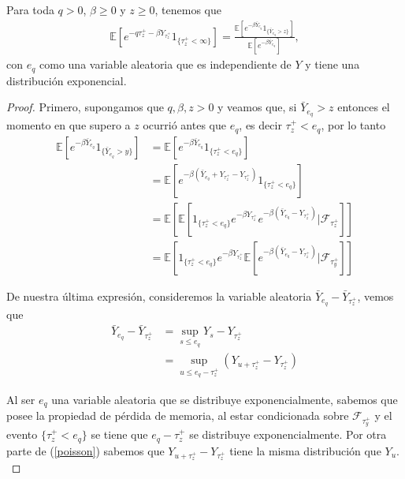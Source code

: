 \begin{lemma}
Para toda $q > 0$, $\beta \geq 0$ y $z \geq 0$, tenemos que
\begin{align}
	\mathbb{E} \left[ e^{-q \tau_{z}^{+} - \beta Y_{\tau_{z}^{+}}} 1_{ \{ \tau_{z}^{+} < \infty \} } \right] = \frac{\mathbb{E} \left[ e^{- \beta \bar{Y}_{e_q}} 1_{ \{ \bar{Y}_{e_q} > z \} } \right]}{\mathbb{E} \left[ e^{- \beta \bar{Y}_{e_q}} \right]}, \label{lema_mckean}
\end{align}
con $e_q$ como una variable aleatoria que es independiente de $Y$ y tiene una distribución exponencial.
\end{lemma}
\begin{proof}
Primero, supongamos que $q, \beta, z > 0$ y veamos que, si $\bar{Y}_{e_q} > z$ entonces el momento en que supero a $z$ ocurrió antes que $e_q$, es decir $\tau_z^{+} < e_q$, por lo tanto
\begin{align*}
	\mathbb{E} \left[ e^{- \beta \bar{Y}_{e_q}} 1_{ \{ \bar{Y}_{e_q} > y \}} \right]  & = \mathbb{E} \left[ e^{- \beta \bar{Y}_{e_q}} 1_{\{\tau_z^{+} < e_q\}} \right] \\
    & = \mathbb{E} \left[ e^{- \beta ( \bar{Y}_{e_q} + Y_{\tau_z^{+}} - Y_{\tau_z^{+}} )} 1_{\{\tau_z^{+} < e_q\}} \right] \\
    & = \mathbb{E} \left[ \mathbb{E} \left[ 1_{\{\tau_z^{+} < e_q\}} e^{- \beta Y_{\tau_z^{+}}} e^{ - \beta (\bar{Y}_{e_q} - Y_{\tau_z^{+}})} \bigg|  \mathcal{F}_{\tau_z^{+}} \right] \right] \\
    & = \mathbb{E} \left[ 1_{\{\tau_z^{+} < e_q\}} e^{- \beta Y_{\tau_z^{+}}} \mathbb{E} \left[ e^{- \beta (\bar{Y}_{e_q} - Y_{\tau_z^{+}})} \bigg|  \mathcal{F}_{\tau_y^{+}} \right] \right]
\end{align*}

De nuestra última expresión, consideremos la variable aleatoria $\bar{Y}_{e_q} - \bar{Y}_{\tau_z^{+}}$, vemos que 
\begin{align*}
	\bar{Y}_{e_q} - \bar{Y}_{\tau_z^{+}} & = \sup_{s \leq e_q} Y_s - Y_{\tau_z^{+}} \\
    & = \sup_{u \leq e_q - \tau_z^{+}} \left( Y_{u + \tau_z^{+}} - Y_{\tau_z^{+}} \right)
\end{align*}

Al ser $e_q$ una variable aleatoria que se distribuye exponencialmente, sabemos que posee la propiedad de pérdida de memoria, al estar condicionada sobre $\mathcal{F}_{\tau_y^{+}}$ y el evento $\{ \tau_z^{+} < e_q \}$ se tiene que $e_q - \tau_z^{+}$ se distribuye exponencialmente. Por otra parte de (\ref{poisson}) sabemos que $Y_{u + \tau_z^{+}} - Y_{\tau_z^{+}}$ tiene la misma distribución que $Y_{u}$. \\


\end{proof}
